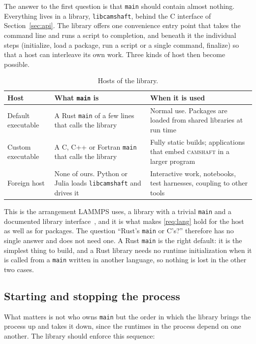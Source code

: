 \documentclass[11pt,a4paper]{article}
\newcommand{\camshaft}{\textsc{camshaft}}
\newcommand{\code}[1]{\texttt{#1}}
\begin{document}
The answer to the first question is that \code{main} should contain almost
nothing.  Everything lives in a library, \code{libcamshaft}, behind the C
interface of Section~\ref{sec:api}.  The library offers one convenience entry
point that takes the command line and runs a script to completion, and
beneath it the individual steps (initialize, load a package, run a script or
a single command, finalize) so that a host can interleave its own work.
Three kinds of host then become possible.

\begin{table}[ht]
\centering
\small
\begin{tabularx}{\textwidth}{@{}l L L@{}}
\toprule
Host & What \code{main} is & When it is used \\
\midrule
Default executable & A Rust \code{main} of a few lines that calls the library & Normal use.  Packages are loaded from shared libraries at run time \\
Custom executable & A C, C++ or Fortran \code{main} that calls the library & Fully static builds; applications that embed \camshaft{} in a larger program \\
Foreign host & None of ours.  Python or Julia loads \code{libcamshaft} and drives it & Interactive work, notebooks, test harnesses, coupling to other tools \\
\bottomrule
\end{tabularx}
\caption{Hosts of the library.}
\label{tab:hosts}
\end{table}

This is the arrangement LAMMPS uses, a library with a trivial \code{main}
and a documented library interface~\cite{lammps}, and it is what makes
\ref{req:lang} hold for the host as well as for packages.  The question
\enquote{Rust's \code{main} or C's?} therefore has no single answer and does
not need one.  A Rust \code{main} is the right default: it is the simplest
thing to build, and a Rust library needs no runtime initialization when it is
called from a \code{main} written in another language, so nothing is lost in
the other two cases.

\subsection{Starting and stopping the process}

What matters is not who owns \code{main} but the order in which the library
brings the process up and takes it down, since the runtimes in the process
depend on one another.  The library should enforce this sequence:
\end{document}
